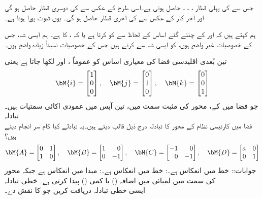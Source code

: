 جس سے  کی پہلی قطار ، ، ،   حاصل ہوتی ہے۔اسی طرح  کے عکس سے  کی دوسری قطار حاصل ہو گی اور آخر کار  کے عکس سے  کی آخری قطار حاصل ہو گی۔ یوں ثبوت پورا ہوتا ہے۔

ہم کہتے ہیں کہ  اور  کے چننے گئے  اساس کے لحاظ سے    کو   کرتا ہے  یا کہ ،  کا  ہے۔ ہم  ایسی شہ، جس کے خصوصیات غیر واضح ہوں، کو ایسی شہ سے  کرتے ہیں جس کے خصوصیات نسبتاً زیادہ واضح ہوں۔

تین بُعدی اقلیدسی فضا  کی معیاری اساس کو عموماً ،  اور  لکھا جاتا ہے یعنی
\begin{align}
\bM{i}=\begin{bmatrix} 1\\0\\0 \end{bmatrix},\quad \bM{j}=\begin{bmatrix}0\\1\\0  \end{bmatrix}, \quad \bM{k}=\begin{bmatrix}0\\0\\1  \end{bmatrix}
\end{align}
جو فضا میں  کے، محور کی مثبت سمت میں، تین آپس میں عمودی اکائی سمتیات ہیں۔
\quad تبادلہ\\
فضا میں کارتیسی نظام کے محور کا تبادلہ درج ذیل قالب دیتے ہیں۔یہ تبادلے کیا کام سر انجام دیتے ہیں؟
\begin{align*}
\bM{A}=\begin{bmatrix*}[r]0&1\\1&0  \end{bmatrix*}, \quad \bM{B}=\begin{bmatrix*}[r]1&0\\0&-1  \end{bmatrix*}, \quad \bM{C}=\begin{bmatrix*}[r]-1&0\\0&-1  \end{bmatrix*}, \quad \bM{D}=\begin{bmatrix*}[r]a&0\\0&1  \end{bmatrix*}
\end{align*}
جوابات:: خط  میں انعکاس ہے۔: خط  میں انعکاس ہے۔: مبدا میں انعکاس ہے جبکہ  محور  کی سمت میں لمبائی میں اضافہ () یا کمی () پیدا کرتی ہے۔  
\quad خطی تبادلہ\\
ایسی خطی تبادلہ دریافت کریں جو   کا نقش  دے۔

